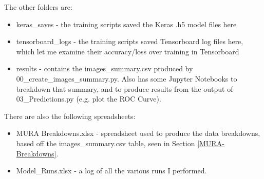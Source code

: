 \documentclass[11pt]{article} %
\theoremstyle{plain}
\theoremstyle{definition}
\begin{document}
\noindent
The other folders are:
\begin{itemize}
\item keras\_saves - the training scripts saved the Keras .h5 model files here
\item tensorboard\_logs - the training scripts saved Tensorboard log files here, which let me examine their accuracy/loss over training in Tensorboard
\item results - contains the images\_summary.csv produced by 00\_create\_images\_summary.py. Also has some Jupyter Notebooks to breakdown that summary, and to produce results from the output of 03\_Predictions.py (e.g. plot the ROC Curve).
\end{itemize}
\noindent
There are also the following spreadsheets:
\begin{itemize}
\item MURA Breakdowns.xlsx - spreadsheet used to produce the data breakdowns, based off the images\_summary.csv table, seen in Section \ref{MURA-Breakdowns}.
\item Model\_Runs.xlsx - a log of all the various runs I performed.
\end{itemize}
\end{document}
